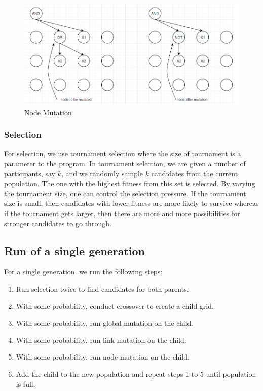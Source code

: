 \documentclass{article}
\begin{document}
\begin{itemize}
		\begin{figure}
			\centering
			\includegraphics[width=\textwidth]{sample6.png}
			\caption{Node Mutation}
			\label{sample6}
		\end{figure}
		
	\end{itemize}
	\subsubsection{Selection}
	For selection, we use tournament selection where the size of tournament is a parameter to the program. In tournament selection, we are given a number of participants, say $k$, and we randomly sample $k$ candidates from the current population. The one with the highest fitness from this set is selected. By varying the tournament size, one can control the selection pressure. If the tournament size is small, then candidates with lower fitness are more likely to survive whereas if the tournament gets larger, then there are more and more possibilities for stronger candidates to go through.
	
	\subsection{Run of a single generation}
For a single generation, we run the following steps:
\begin{enumerate}
\item Run selection twice to find candidates for both parents.
\item With some probability, conduct crossover to create a child grid.
\item With some probability, run global mutation on the child.
\item With some probability, run link mutation on the child.
\item With some probability, run node mutation on the child.
\item Add the child to the new population and repeat steps 1 to 5 until population is full.
\end{enumerate}
\end{document}
